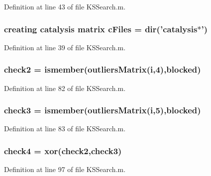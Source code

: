 Definition at line 43 of file K\+S\+Search.\+m.

\hypertarget{a00030_a9eab57ccb42a39c704f47dc30e4f4515}{
\subsubsection[{c\+Files}]{\setlength{\rightskip}{0pt plus 5cm}creating {\bf catalysis} matrix c\+Files = {\bf dir}('{\bf catalysis}$\ast$')}}\label{a00030_a9eab57ccb42a39c704f47dc30e4f4515}


Definition at line 39 of file K\+S\+Search.\+m.

\hypertarget{a00030_a98a8838a85ed24032563a44271b1525a}{
\subsubsection[{check2}]{\setlength{\rightskip}{0pt plus 5cm}check2 = ismember({\bf outliers\+Matrix}({\bf i},4),{\bf blocked})}}\label{a00030_a98a8838a85ed24032563a44271b1525a}


Definition at line 82 of file K\+S\+Search.\+m.

\hypertarget{a00030_adfd17509248a56986475a25ee50fe488}{
\subsubsection[{check3}]{\setlength{\rightskip}{0pt plus 5cm}check3 = ismember({\bf outliers\+Matrix}({\bf i},5),{\bf blocked})}}\label{a00030_adfd17509248a56986475a25ee50fe488}


Definition at line 83 of file K\+S\+Search.\+m.

\hypertarget{a00030_ab21c5bac10f7ac73374c002e908df5ac}{
\subsubsection[{check4}]{\setlength{\rightskip}{0pt plus 5cm}check4 = xor({\bf check2},{\bf check3})}}\label{a00030_ab21c5bac10f7ac73374c002e908df5ac}


Definition at line 97 of file K\+S\+Search.\+m.

